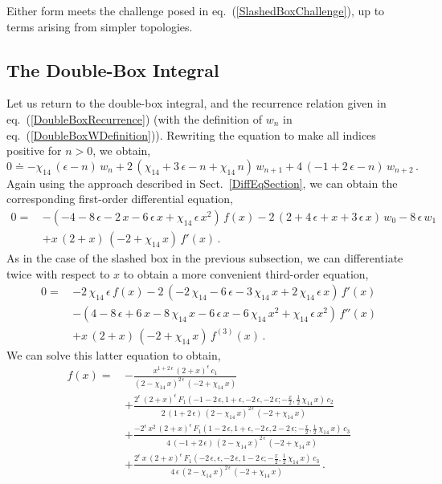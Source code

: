 \documentclass[aps,prd,preprint,groupedaddress,nofootinbib,showpacs,eqsecnum]{revtex4}
\def\sect#1{Sect.~{\ref{#1}}}
\def\eqn#1{eq.~(\ref{#1})}
\def\eps{\epsilon}
\begin{document}
Either form meets the challenge posed in \eqn{SlashedBoxChallenge}, up to
terms arising from simpler topologies.

\subsection{The Double-Box Integral}

Let us return to the double-box integral, and the recurrence
relation given in \eqn{DoubleBoxRecurrence} 
(with the definition of $w_n$ in \eqn{DoubleBoxWDefinition}).
Rewriting the equation to make all indices positive for $n>0$, we
obtain,
\begin{equation}
0\doteq 
-\chi_{14}\,(\eps-n)\,w_n
+2\,(\chi_{14}+3\,\eps-n+\chi_{14}\,n)\,w_{n+1}
+4\,(-1+2\,\eps-n)\,w_{n+2}
\,.
\end{equation}
Again using the approach described in \sect{DiffEqSection}, we can obtain 
the corresponding first-order differential equation,
\begin{equation}
\begin{aligned}
0 = \,&
-(-4-8\,\eps-2\,x-6\,\eps\,x+\chi_{14}\,\eps\,x^{2})\,f(x)
-2\,(2+4\,\eps+x+3\,\eps\,x)\,w_0-8\,\eps\,w_1
\\ &
+x\,(2+x)\,(-2+\chi_{14}\,x)\,f'(x)
\,.
\end{aligned}
\end{equation}
As in the case of the slashed box in the previous subsection, 
we can differentiate twice with respect to $x$ to obtain a more
convenient third-order equation,
\begin{equation}
\begin{aligned}
0 =\,&
-2\,\chi_{14}\,\eps \,f(x)
-2\,(-2\,\chi_{14}-6\,\eps-3\,\chi_{14}\,x+2\,\chi_{14}\,\eps\,x)\,f'(x)
\\ &
-(4-8\,\eps+6\,x-8\,\chi_{14}\,x-6\,\eps\,x-6\,\chi_{14}\,x^{2}
+\chi_{14}\,\eps\,x^{2})\,f''(x)
\\ &
+x\,(2+x)\,(-2+\chi_{14}\,x)\,f^{(3)}(x)
\,.
\end{aligned}
\end{equation}
We can solve this latter equation
to obtain,
\begin{equation}
\begin{aligned}
f(x) = \,&
-\frac{x^{1+2\,\eps}\,(2+x)^{\eps}\,c_1}
{(2-\chi_{14}\,x)^{2\,\eps}\,(-2+\chi_{14}\,x)}
\\& +\frac{2^{\eps}\,(2+x)^{\eps}
	\,F_1(-1-2\,\eps,1+\eps,-2\,\eps,-2\,\eps;
	-\frac{x}{2},\frac{1}{2}\,\chi_{14}\,x)\,c_2}
{2\,(1+2\,\eps)\,(2-\chi_{14}\,x)^{2\,\eps}\,(-2+\chi_{14}\,x)}
\\ &
+\frac{-2^{\eps}\,x^{2}\,(2+x)^{\eps}
	\,F_1(1-2\,\eps,1+\eps,-2\,\eps,2-2\,\eps;
	-\frac{x}{2},\frac{1}{2}\,\chi_{14}\,x)\,c_3}
{4\,(-1+2\,\eps)\,(2-\chi_{14}\,x)^{2\,\eps}\,(-2+\chi_{14}\,x)}
\\&
+\frac{2^{\eps}\,x\,(2+x)^{\eps}
	\,F_1(-2\,\eps,\eps,-2\,\eps,1-2\,\eps;
	-\frac{x}{2},\frac{1}{2}\,\chi_{14}\,x)\,c_3}
{4\,\eps\,(2-\chi_{14}\,x)^{2\,\eps}\,(-2+\chi_{14}\,x)}
\,.
\end{aligned}
\end{equation}
\end{document}
